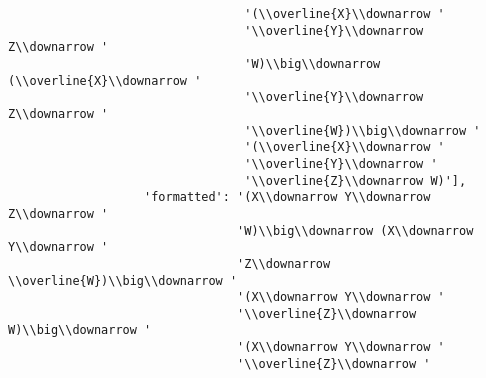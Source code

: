 \begin{verbatim}
                                 '(\\overline{X}\\downarrow '
                                 '\\overline{Y}\\downarrow Z\\downarrow '
                                 'W)\\big\\downarrow (\\overline{X}\\downarrow '
                                 '\\overline{Y}\\downarrow Z\\downarrow '
                                 '\\overline{W})\\big\\downarrow '
                                 '(\\overline{X}\\downarrow '
                                 '\\overline{Y}\\downarrow '
                                 '\\overline{Z}\\downarrow W)'],
                   'formatted': '(X\\downarrow Y\\downarrow Z\\downarrow '
                                'W)\\big\\downarrow (X\\downarrow Y\\downarrow '
                                'Z\\downarrow \\overline{W})\\big\\downarrow '
                                '(X\\downarrow Y\\downarrow '
                                '\\overline{Z}\\downarrow W)\\big\\downarrow '
                                '(X\\downarrow Y\\downarrow '
                                '\\overline{Z}\\downarrow '

\end{verbatim}
